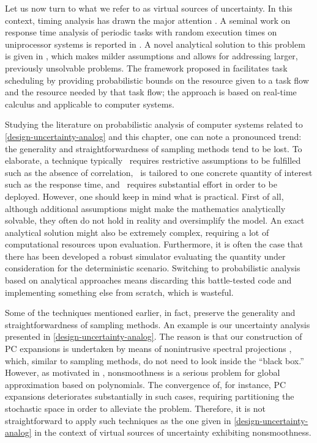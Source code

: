 Let us now turn to what we refer to as virtual sources of uncertainty. In this
context, timing analysis has drawn the major attention \cite{quinton2012}. A
seminal work on response time analysis of periodic tasks with random execution
times on uniprocessor systems is reported in \cite{diaz2002}. A novel analytical
solution to this problem is given in \cite{tanasa2015}, which makes milder
assumptions and allows for addressing larger, previously unsolvable problems.
The framework proposed in \cite{santinelli2011} facilitates task scheduling by
providing probabilistic bounds on the resource given to a task flow and the
resource needed by that task flow; the approach is based on real-time calculus
and applicable to computer systems.

Studying the literature on probabilistic analysis of computer systems related to
\cref{design-uncertainty-analog} and this chapter, one can note a pronounced
trend: the generality and straightforwardness of sampling methods tend to be
lost. To elaborate, a technique typically \one~requires restrictive assumptions
to be fulfilled such as the absence of correlation, \two~is tailored to one
concrete quantity of interest such as the response time, and \three~requires
substantial effort in order to be deployed. However, one should keep in mind
what is practical. First of all, although additional assumptions might make the
mathematics analytically solvable, they often do not hold in reality and
oversimplify the model. An exact analytical solution might also be extremely
complex, requiring a lot of computational resources upon evaluation.
Furthermore, it is often the case that there has been developed a robust
simulator evaluating the quantity under consideration for the deterministic
scenario. Switching to probabilistic analysis based on analytical approaches
means discarding this battle-tested code and implementing something else from
scratch, which is wasteful.

Some of the techniques mentioned earlier, in fact, preserve the generality and
straightforwardness of sampling methods. An example is our uncertainty analysis
presented in \cref{design-uncertainty-analog}. The reason is that our
construction of \ac{PC} expansions is undertaken by means of nonintrusive
spectral projections \cite{xiu2010}, which, similar to sampling methods, do not
need to look inside the ``black box.'' However, as motivated in
, nonsmoothness is a serious problem for global
approximation based on polynomials. The convergence of, for instance, \ac{PC}
expansions deteriorates substantially in such cases, requiring partitioning the
stochastic space in order to alleviate the problem. Therefore, it is not
straightforward to apply such techniques as the one given in
\cref{design-uncertainty-analog} in the context of virtual sources of
uncertainty exhibiting nonsmoothness.

